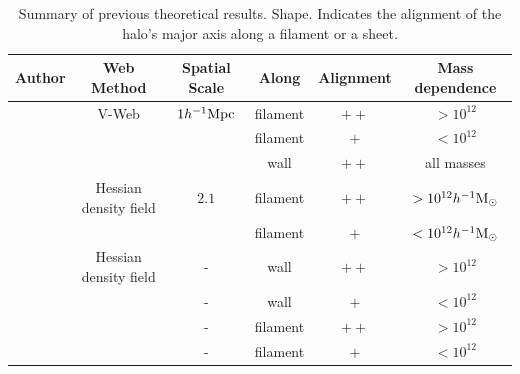 \documentclass[usenatbib]{mn2e}
\newcommand{\hMpc}{{\ifmmode{h^{-1}{\rm Mpc}}\else{$h^{-1}$Mpc }\fi}}
\newcommand{\hMsun}{{\ifmmode{h^{-1}{\rm
        {M_{\odot}}}}\else{$h^{-1}{\rm{M_{\odot}}}$}\fi}}
\begin{document}
\begin{table}
\begin{tabular}{cccccc}\hline\hline
Author & Web Method & Spatial Scale & Along &
Alignment & Mass dependence\\\hline

\cite{Libeskind2013} & V-Web & $1 \hMpc$ & 
filament &$++$ & $>10^{12}$\hMsun\\

&   & & 
filament &$+$ & $<10^{12}$\hMsun\\

&   & & 
wall & $++$ & all masses\\

\cite{Zhang2009}  & Hessian density field &  $2.1$\hMpc & 
filament & $++$ & $>10^{12}\hMsun$\\

& &  & 
filament & $+$ & $<10^{12}\hMsun$\\

\cite{AragonCalvo2007} & Hessian density field & - &
wall & $++$ & $>10^{12}$\hMsun\\

& & - &
wall & $+$ & $<10^{12}$\hMsun\\

& & - &
filament& $++$ & $>10^{12}$\hMsun\\

& & - &
filament& $+$ & $<10^{12}$\hMsun\\\hline \hline

\end{tabular}\\
\caption{Summary of previous theoretical results.
Shape. Indicates the alignment of the halo's major axis along a
filament or a sheet.} 
\end{table}
\end{document}
